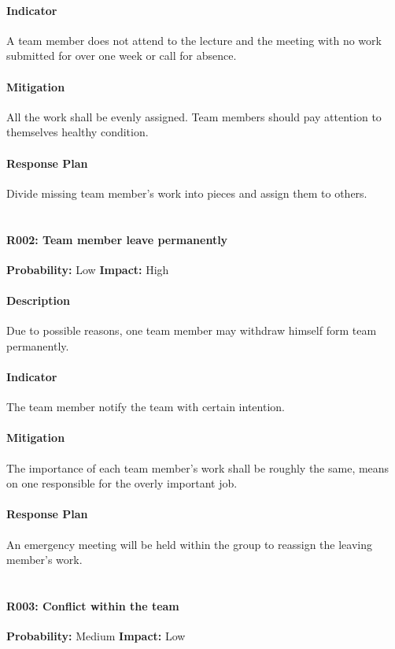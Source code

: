\documentclass[11pt, a4paper]{report}
\begin{document}
	\paragraph{Indicator}A team member does not attend to the lecture and the meeting with no work submitted for over one week or call for absence.
	\paragraph{Mitigation}All the work shall be evenly assigned. Team members should pay attention to themselves healthy condition.\paragraph{Response Plan}Divide missing team member's work into pieces and assign them to others. \\\\


	\paragraph{R002: Team member leave permanently} \hspace{1cm} \textbf{Probability: }Low\hspace{1cm}   \textbf{Impact: }High
	\paragraph{Description}Due to possible reasons, one team member may withdraw himself form team permanently.
	\paragraph{Indicator}The team member notify the team with certain intention.
	\paragraph{Mitigation}The importance of each team member's work shall be roughly the same, means on one responsible for the overly important job. 
	\paragraph{Response Plan}An emergency meeting will be held within the group to reassign the leaving member's work.\\\\


	\paragraph{R003: Conflict within the team} \hspace{1cm} \textbf{Probability: }Medium\hspace{1cm}   \textbf{Impact: }Low
\end{document}
